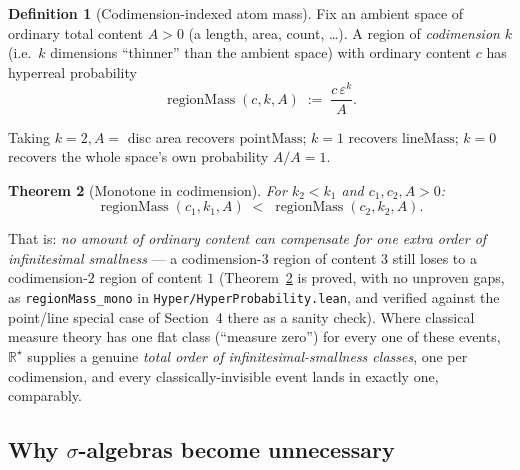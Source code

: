 \documentclass[11pt]{article}
\newtheorem{theorem}{Theorem}[section]
\theoremstyle{definition}
\newtheorem{definition}[theorem]{Definition}
\theoremstyle{remark}
\newcommand{\Rstar}{\mathbb{R}^{\star}}
\newcommand{\eps}{\varepsilon}
\begin{document}
\begin{definition}[Codimension-indexed atom mass]\label{def:regionmass}
Fix an ambient space of ordinary total content $A>0$ (a length, area,
count, \ldots). A region of \emph{codimension} $k$ (i.e.\ $k$ dimensions
``thinner'' than the ambient space) with ordinary content $c$ has
hyperreal probability
\[
\operatorname{regionMass}(c,k,A) \;:=\; \frac{c\,\eps^{k}}{A}.
\]
\end{definition}

Taking $k=2,A=$ disc area recovers $\mathrm{pointMass}$; $k=1$ recovers
$\mathrm{lineMass}$; $k=0$ recovers the whole space's own probability $A/A=1$.

\begin{theorem}[Monotone in codimension]\label{thm:regionmass-mono}
For $k_2 < k_1$ and $c_1,c_2,A>0$:
\[
\operatorname{regionMass}(c_1,k_1,A) \;<\; \operatorname{regionMass}(c_2,k_2,A).
\]
\end{theorem}

That is: \emph{no amount of ordinary content can compensate for one extra
order of infinitesimal smallness} — a codimension-$3$ region of content
$3$ still loses to a codimension-$2$ region of content $1$
(Theorem~\ref{thm:regionmass-mono} is proved, with no unproven gaps, as
\texttt{regionMass\_mono} in \texttt{Hyper/HyperProbability.lean}, and
verified against the point/line special case of Section~4 there as a
sanity check). Where classical measure theory has one flat class
(``measure zero'') for every one of these events, $\Rstar$ supplies a
genuine \emph{total order of infinitesimal-smallness classes}, one per
codimension, and every classically-invisible event lands in exactly one,
comparably.

\subsection{Why $\sigma$-algebras become unnecessary}
\end{document}
